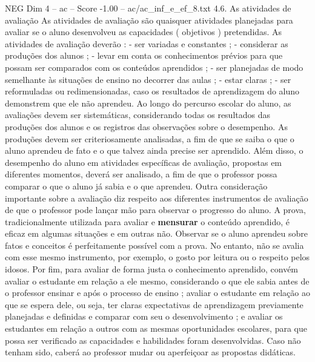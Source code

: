 \begin{textsample}{NEG Dim 4 – ac – Score -1.00 – ac/ac\_inf\_e\_ef\_8.txt}  \label{ex:f4_neg_047}
4.6.
As atividades de avaliação As atividades de avaliação são quaisquer atividades planejadas para avaliar se o aluno desenvolveu as capacidades ( objetivos ) pretendidas.
As atividades de avaliação deverão : - ser variadas e constantes ; - considerar as produções dos alunos ; - levar em conta os conhecimentos prévios para que possam ser comparados com os conteúdos aprendidos ; - ser planejadas de modo semelhante às situações de ensino no decorrer das aulas ; - estar claras ; - ser reformuladas ou redimensionadas, caso os resultados de aprendizagem do aluno demonstrem que ele não aprendeu.
Ao longo do percurso escolar do aluno, as avaliações devem ser sistemáticas, considerando todas os resultados das produções dos alunos e os registros das observações sobre o desempenho.
As produções devem ser criteriosamente analisadas, a fim de que se saiba o que o aluno aprendeu de fato e o que talvez ainda precise ser aprendido.
Além disso, o desempenho do aluno em atividades específicas de avaliação, propostas em diferentes momentos, deverá ser analisado, a fim de que o professor possa comparar o que o aluno já sabia e o que aprendeu.
Outra consideração importante sobre a avaliação diz respeito aos diferentes instrumentos de avaliação de que o professor pode lançar mão para observar o progresso do aluno.
A prova, tradicionalmente utilizada para avaliar e \textbf{mensurar} o conteúdo aprendido, é eficaz em algumas situações e em outras não.
Observar se o aluno aprendeu sobre fatos e conceitos é perfeitamente possível com a prova.
No entanto, não se avalia com esse mesmo instrumento, por exemplo, o gosto por leitura ou o respeito pelos idosos.
Por fim, para avaliar de forma justa o conhecimento aprendido, convém avaliar o estudante em relação a ele mesmo, considerando o que ele sabia antes de o professor ensinar e após o processo de ensino ; avaliar o estudante em relação ao que se espera dele, ou seja, ter claras expectativas de aprendizagem previamente planejadas e definidas e comparar com seu o desenvolvimento ; e avaliar os estudantes em relação a outros com as mesmas oportunidades escolares, para que possa ser verificado as capacidades e habilidades foram desenvolvidas.
Caso não tenham sido, caberá ao professor mudar ou aperfeiçoar as propostas didáticas.

\end{textsample}
